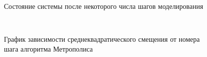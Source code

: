 \documentclass[14pt,a4paper,report]{ncc}
\begin{document}
{  \begin{figure}[h!]
\caption{Состояние системы после некоторого числа шагов моделирования}
\label{ris:image9}
\end{figure}
\

  \begin{figure}[h!]
\caption{График зависимости среднеквадратического смещения от номера шага алгоритма Метрополиса}
\label{ris:image10}
\end{figure}

}
\end{document}
